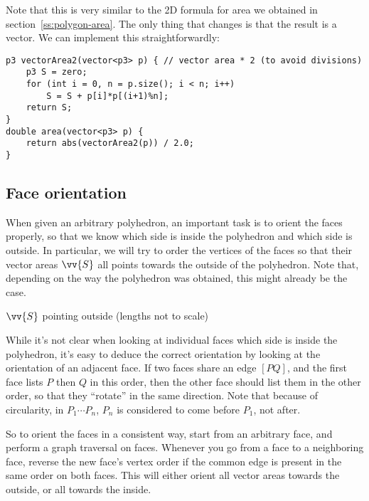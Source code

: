 
Note that this is very similar to the 2D formula for area we obtained in section~\ref{ss:polygon-area}. The only thing that changes is that the result is a vector. We can implement this straightforwardly:
\begin{lstlisting}
p3 vectorArea2(vector<p3> p) { // vector area * 2 (to avoid divisions)
    p3 S = zero;
    for (int i = 0, n = p.size(); i < n; i++)
        S = S + p[i]*p[(i+1)%n];
    return S;
}
double area(vector<p3> p) {
    return abs(vectorArea2(p)) / 2.0;
}
\end{lstlisting}

\subsection{Face orientation}
When given an arbitrary polyhedron, an important task is to orient the faces properly, so that we know which side is inside the polyhedron and which side is outside. In particular, we will try to order the vertices of the faces so that their vector areas $\vv{S}$ all points towards the outside of the polyhedron. Note that, depending on the way the polyhedron was obtained, this might already be the case.

\begin{center}
    
    $\vv{S}$ pointing outside (lengths not to scale)
\end{center}

While it's not clear when looking at individual faces which side is inside the polyhedron, it's easy to deduce the correct orientation by looking at the orientation of an adjacent face. If two faces share an edge $[PQ]$, and the first face lists $P$ then $Q$ in this order, then the other face should list them in the other order, so that they ``rotate'' in the same direction. Note that because of circularity, in $P_1\cdots P_n$, $P_n$ is considered to come before $P_1$, not after.


So to orient the faces in a consistent way, start from an arbitrary face, and perform a graph traversal on faces. Whenever you go from a face to a neighboring face, reverse the new face's vertex order if the common edge is present in the same order on both faces. This will either orient all vector areas towards the outside, or all towards the inside.

